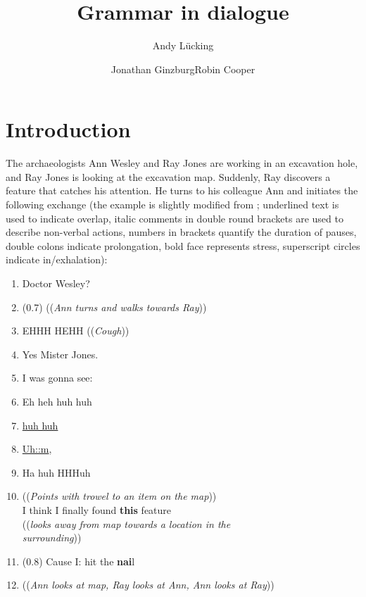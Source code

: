 \documentclass[output=paper,biblatex,babelshorthands,newtxmath,draftmode,colorlinks,citecolor=brown]{langscibook}
\author{Andy Lücking\affiliation{Université de Paris, Goethe-Universität Frankfurt}\and Jonathan
  Ginzburg\affiliation{Université de Paris}\lastand Robin Cooper\affiliation{Göteborgs Universitet}}
\title{Grammar in dialogue}
\begin{document}
\maketitle
\label{chap-pragmatics}



\section{Introduction} 
\label{sec:introduction}

The archaeologists Ann Wesley and Ray Jones are working in an excavation hole, and Ray Jones is looking at the excavation map.
%
Suddenly, Ray discovers a feature that catches his attention. %
He turns to his colleague Ann and initiates the following exchange (the example is slightly modified from ; underlined text is used to indicate overlap, italic comments in double round brackets are used to describe non-verbal actions, numbers in brackets quantify the duration of pauses, double colons indicate prolongation, bold face represents stress, superscript circles indicate in/exhalation):
%
\ea \label{ex:ann-ray}
\begin{enumerate}[noitemsep]
    \item {} Doctor Wesley?
    \item \speaking{} \quad (0.7) ((\textit{Ann turns and walks towards Ray}))
    \item {} EHHH HEHH ((\textit{Cough}))
    \item \speaking{} Yes Mister Jones.
    \item {} I was gonna see:
    \item {} \textdegree Eh heh huh huh
    \item \speaking{}  \underline{huh huh}
    \item {}  \underline{Uh::m},
    \item {} Ha huh HHHuh
    \item {} ((\textit{Points with trowel to an item on the map})) \\ 
    \speaking{} I think I finally found \textbf{this} feature \\
    \speaking{} ((\textit{looks away from map towards a location in the}\\ \speaking{} \textit{surrounding}))
    \item \speaking{} (0.8) Cause I: hit the \textbf{nai}l
    \item ((\textit{Ann looks at map, Ray looks at Ann, Ann looks at Ray}))
\end{enumerate}
\z
\end{document}
